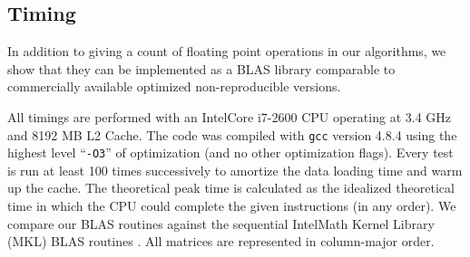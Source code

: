 \subsection{Timing}
  In addition to giving a count of floating point operations in our algorithms, we show that they can be implemented as a BLAS library comparable to commercially available optimized non-reproducible versions.

  All timings are performed with an Intel\textregistered Core i7-2600 CPU operating at 3.4 GHz and 8192 MB L2 Cache. The code was compiled with \texttt{gcc} version 4.8.4 using the highest level ``\texttt{-O3}'' of optimization (and no other optimization flags). Every test is run at least 100 times successively to amortize the data loading time and warm up the cache. The theoretical peak time is calculated as the idealized theoretical time in which the CPU could complete the given instructions (in any order). We compare our BLAS routines against the sequential Intel\textregistered Math Kernel Library (MKL) BLAS routines \cite{MKL}. All matrices are represented in column-major order.

